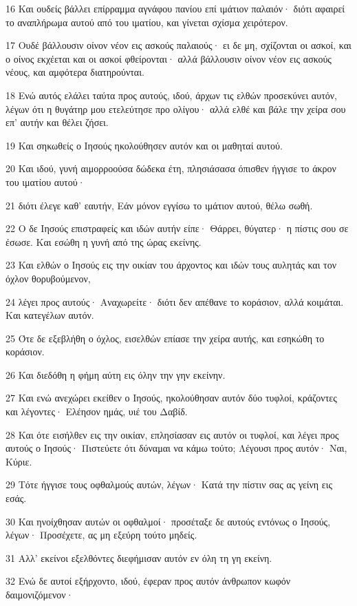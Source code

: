 \par 16 Και ουδείς βάλλει επίρραμμα αγνάφου πανίου επί ιμάτιον παλαιόν· διότι αφαιρεί το αναπλήρωμα αυτού από του ιματίου, και γίνεται σχίσμα χειρότερον.
\par 17 Ουδέ βάλλουσιν οίνον νέον εις ασκούς παλαιούς· ει δε μη, σχίζονται οι ασκοί, και ο οίνος εκχέεται και οι ασκοί φθείρονται· αλλά βάλλουσιν οίνον νέον εις ασκούς νέους, και αμφότερα διατηρούνται.
\par 18 Ενώ αυτός ελάλει ταύτα προς αυτούς, ιδού, άρχων τις ελθών προσεκύνει αυτόν, λέγων ότι η θυγάτηρ μου ετελεύτησε προ ολίγου· αλλά ελθέ και βάλε την χείρα σου επ' αυτήν και θέλει ζήσει.
\par 19 Και σηκωθείς ο Ιησούς ηκολούθησεν αυτόν και οι μαθηταί αυτού.
\par 20 Και ιδού, γυνή αιμορροούσα δώδεκα έτη, πλησιάσασα όπισθεν ήγγισε το άκρον του ιματίου αυτού·
\par 21 διότι έλεγε καθ' εαυτήν, Εάν μόνον εγγίσω το ιμάτιον αυτού, θέλω σωθή.
\par 22 Ο δε Ιησούς επιστραφείς και ιδών αυτήν είπε· Θάρρει, θύγατερ· η πίστις σου σε έσωσε. Και εσώθη η γυνή από της ώρας εκείνης.
\par 23 Και ελθών ο Ιησούς εις την οικίαν του άρχοντος και ιδών τους αυλητάς και τον όχλον θορυβούμενον,
\par 24 λέγει προς αυτούς· Αναχωρείτε· διότι δεν απέθανε το κοράσιον, αλλά κοιμάται. Και κατεγέλων αυτόν.
\par 25 Ότε δε εξεβλήθη ο όχλος, εισελθών επίασε την χείρα αυτής, και εσηκώθη το κοράσιον.
\par 26 Και διεδόθη η φήμη αύτη εις όλην την γην εκείνην.
\par 27 Και ενώ ανεχώρει εκείθεν ο Ιησούς, ηκολούθησαν αυτόν δύο τυφλοί, κράζοντες και λέγοντες· Ελέησον ημάς, υιέ του Δαβίδ.
\par 28 Και ότε εισήλθεν εις την οικίαν, επλησίασαν εις αυτόν οι τυφλοί, και λέγει προς αυτούς ο Ιησούς· Πιστεύετε ότι δύναμαι να κάμω τούτο; Λέγουσι προς αυτόν· Ναι, Κύριε.
\par 29 Τότε ήγγισε τους οφθαλμούς αυτών, λέγων· Κατά την πίστιν σας ας γείνη εις εσάς.
\par 30 Και ηνοίχθησαν αυτών οι οφθαλμοί· προσέταξε δε αυτούς εντόνως ο Ιησούς, λέγων· Προσέχετε, ας μη εξεύρη τούτο μηδείς.
\par 31 Αλλ' εκείνοι εξελθόντες διεφήμισαν αυτόν εν όλη τη γη εκείνη.
\par 32 Ενώ δε αυτοί εξήρχοντο, ιδού, έφεραν προς αυτόν άνθρωπον κωφόν δαιμονιζόμενον·
